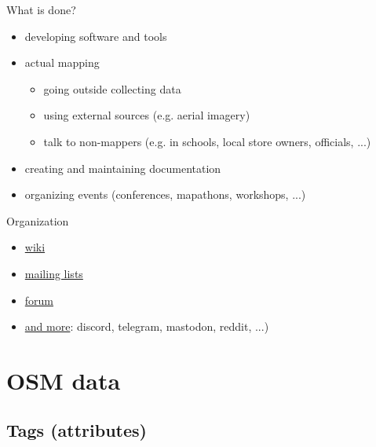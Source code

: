 \documentclass{beamer}
\begin{document}
			\begin{frame}{What is done?}
				\begin{itemize}
					\item developing software and tools
					\item actual mapping
					\begin{itemize}
						\item going outside collecting data
						\item using external sources (e.g. aerial imagery)
						\item talk to non-mappers (e.g. in schools, local store owners, officials, ...)
					\end{itemize}
					\item creating and maintaining documentation
					\item organizing events (conferences, mapathons, workshops, ...)
				\end{itemize}
			\end{frame}
		
			\begin{frame}{Organization}
				\begin{itemize}
					\item \href{https://wiki.openstreetmap.org/}{wiki}
					\item \href{https://wiki.openstreetmap.org/wiki/Mailing_lists}{mailing lists}
					\item \href{https://community.openstreetmap.org/}{forum}
					\item \href{https://wiki.openstreetmap.org/wiki/Contact_channels}{and more}: discord, telegram, mastodon, reddit, ...)
				\end{itemize}
			\end{frame}

	\section{OSM data}
		
		\begin{frame}
			\tableofcontents[currentsection]
		\end{frame}
		
		\subsection{Tags (attributes)}
		
\end{document}
